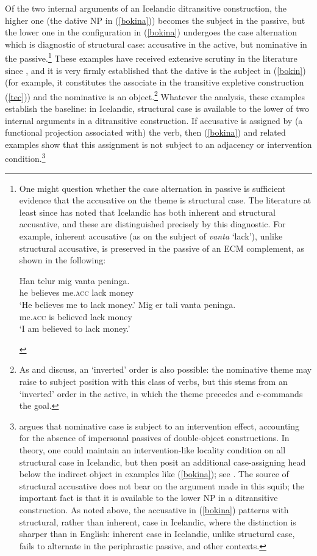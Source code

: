 \documentclass[output=paper]{LSP/langsci}
\begin{document}
Of the two internal arguments of an Icelandic ditransitive construction, the higher one (the dative NP in (\ref{bokina})) becomes the subject in the passive, but the lower one in the configuration in (\ref{bokina}) undergoes the case alternation which is diagnostic of structural case: accusative in the active, but nominative in the passive.\footnote{\label{larsonq}One might question whether the case alternation in passive is sufficient evidence that the accusative on the theme is structural case. The literature at least since \citet{andrews82} has noted that Icelandic has both inherent and structural accusative, and these are distinguished precisely by this diagnostic. For example, inherent accusative (as on the subject of  \textit{vanta} `lack'), unlike structural accusative, is preserved in the passive of an ECM complement, as shown in the following: 

\begin{xlisti}
\ex \gll Han telur mig vanta peninga. \\
he believes me.\textsc{acc} lack money \\ \nobreak
\glt `He believes me to lack money.'\nobreak
\ex \gll Mig er tali{\dh} vanta peninga. \\
me.\textsc{acc} is believed lack money \\
\glt `I am believed to lack money.' \citep{andrews82}
\end{xlisti}}
These examples have received extensive scrutiny in the literature since \cite{zmt85}, and it is very firmly established that the dative is the subject in (\ref{bokin}) (for example, it constitutes the associate in the transitive expletive construction (\ref{tec})) and the nominative is an object.\footnote{As \citealt{holmberg94} and \citealt{holmplat95} discuss, an `inverted' order is also possible: the nominative theme may raise to subject position with this class of verbs, but this stems from an `inverted' order in the active, in which the theme precedes and c-commands the goal.} Whatever the analysis, these examples establish the baseline: in Icelandic, structural case is available to the lower of two internal arguments in a ditransitive construction. If accusative is assigned by (a functional projection associated with) the verb, then (\ref{bokina}) and related examples show that this assignment is not subject to an adjacency or intervention condition.\footnote{\citet{holmberg02} argues that nominative case is subject to an intervention effect, accounting for the absence of impersonal passives of double-object constructions. In theory, one could maintain an intervention-like locality condition on all structural case in Icelandic, but then posit an additional case-assigning head below the indirect object in examples like (\ref{bokina}); see \cite{svenonius06}. The source of structural accusative does not bear on the argument made in this squib; the important fact is that it is available to the lower NP in a ditransitive construction. As noted above, the accusative in (\ref{bokina}) patterns with structural, rather than inherent, case in Icelandic, where the distinction is sharper than in English: inherent case in Icelandic, unlike structural case, fails to alternate in the periphrastic passive, and other contexts.} 
\end{document}
